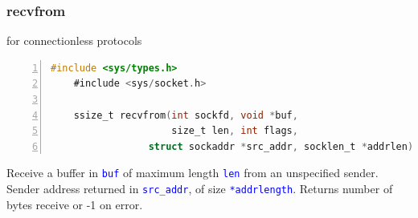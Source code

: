 \documentclass[12pt]{beamer}
\begin{document}
\begin{frame}[fragile]
	\frametitle{recvfrom}
	{\footnotesize for connectionless protocols}
	{\tiny
	\begin{lstlisting}[language=C, breaklines=true, commentstyle=\color{mygreen},frame=lrtb,  rulecolor=\color{black}, numbers=left,  numbersep=5pt, numberstyle=\tiny\color{mygray}]
	#include <sys/types.h>
	#include <sys/socket.h>
	
	ssize_t recvfrom(int sockfd, void *buf, 
	                 size_t len, int flags,
                 struct sockaddr *src_addr, socklen_t *addrlen);
	\end{lstlisting}}
	{\footnotesize
Receive a buffer in \texttt{\textcolor{blue}{buf}} of maximum length \texttt{\textcolor{blue}{len}} from an unspecified sender. \\Sender address returned in \texttt{\textcolor{blue}{src\_addr}}, of size \texttt{\textcolor{blue}{*addrlength}}. Returns number of bytes receive or -1 on error.
	}
\end{frame}	
\end{document}
